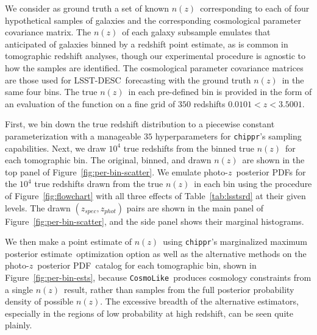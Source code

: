 \documentclass[iop]{emulateapj}
\newcommand{\todo}[3]{{\color{#2}\emph{#1}: #3}}
\newcommand{\aim}[1]{\todo{AIM}{red}{#1}}
\newcommand{\new}[2]{{\color{red}\sout{#1}}\ {\color{blue}{#2}}}%
\newcommand{\Fig}[1]{Figure~\ref{#1}}
\newcommand{\project}[1]{\textsc{#1}}
\newcommand{\lsst}{\project{LSST}}
\newcommand{\desc}{\lsst-\project{DESC}}
\newcommand{\repo}[1]{\texttt{#1}}
\newcommand{\chippr}{\repo{chippr}}
\newcommand{\cosmolike}{\repo{CosmoLike}}
\newcommand{\pz}{photo-$z$}
\newcommand{\pzpdf}{\pz\ posterior PDF}
\newcommand{\nz}{$n(z)$}
\newcommand{\mmle}{marginalized maximum posterior estimate}
\begin{document}
{	%
	
	We consider as ground truth a set of known \nz\ corresponding to each of four hypothetical samples of galaxies and the corresponding cosmological parameter covariance matrix.
	The \nz\ of each galaxy subsample emulates that anticipated of galaxies binned by a redshift point estimate, as is common in tomographic redshift analyses, though our experimental procedure is agnostic to how the samples are identified.
	The cosmological parameter covariance matrices are those used for \desc\ forecasting with the ground truth \nz\ in the same four bins.
	The true \nz\ in each pre-defined bin is provided in the form of an evaluation of the function on a fine grid of $350$ redshifts $0.0101 < z < 3.5001$.
	
	First, we bin down the true redshift distribution to a piecewise constant parameterization with a manageable $35$ hyperparameters for \chippr's sampling capabilities.
	Next, we draw $10^{4}$ true redshifts from the binned true \nz\ for each tomographic bin.
	The original, binned, and drawn \nz\ are shown in the top panel of \Fig{fig:per-bin-scatter}.
	We emulate \pzpdf s for the $10^{4}$ true redshifts drawn from the true \nz\ in each bin using the procedure of \Fig{fig:flowchart} with all three effects of Table~\ref{tab:lsstsrd} at their given levels.
	The drawn $(z_{spec}, z_{phot})$ pairs are shown in the main panel of \Fig{fig:per-bin-scatter}, and the side panel shows their marginal histograms.
	
	We then make a point estimate of \nz\ using \chippr's \mmle\ optimization option as well as the alternative methods on the \pzpdf\ catalog for each tomographic bin, shown in \Fig{fig:per-bin-ests}, because \cosmolike\ produces cosmology constraints from a single \nz\ result, rather than samples from the full posterior probability density of possible \nz.
	The excessive breadth of the alternative estimators, especially in the regions of low probability at high redshift, can be seen quite plainly.
	
}
\end{document}
